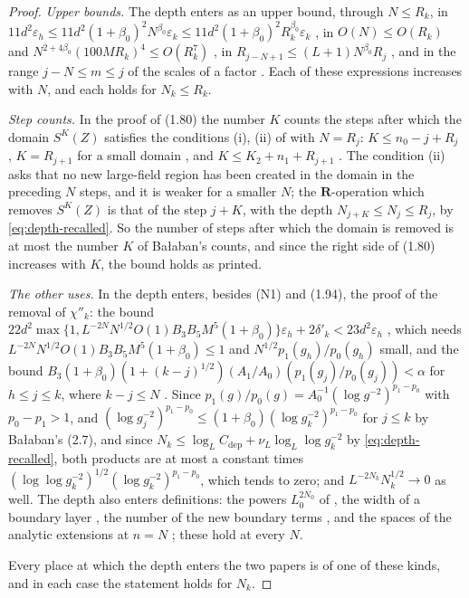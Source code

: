 \documentclass[11pt]{preprint}
\numberwithin{equation}{section}
\theoremstyle{definition}
\theoremstyle{remark}
\theoremstyle{plain}
\begin{document}
\begin{proof}
\emph{Upper bounds.} The depth enters as an upper bound, through $N \leq R_k$, in $11d^2\varepsilon_h \leq 11d^2(1 + \beta_0)^2N^{\beta_0}\varepsilon_k \leq 11d^2(1 + \beta_0)^2R_k^{\beta_0}\varepsilon_k$ \cite[p.~362]{BalabanLFR2}, in $O(N) \leq O(R_k)$ and $N^{2+4\beta_0}(100MR_k)^4 \leq O(R_k^7)$ \cite[p.~366]{BalabanLFR2}, in $R_{j-N+1} \leq (L + 1)N^{\beta_0}R_j$ \cite[pp.~382, 383]{BalabanLFR2}, and in the range $j - N \leq m \leq j$ of the scales of a factor \cite[p.~381]{BalabanLFR2}. Each of these expressions increases with $N$, and each holds for $N_k \leq R_k$.

\emph{Step counts.} In the proof of (1.80) the number $K$ counts the steps after which the domain $S^K(Z)$ satisfies the conditions (i), (ii) of \cite[p.~177]{BalabanLFR1} with $N = R_j$: $K \leq n_0 - j + R_j$ \cite[p.~385]{BalabanLFR2}, $K = R_{j+1}$ for a small domain \cite[p.~386]{BalabanLFR2}, and $K \leq K_2 + n_1 + R_{j+1}$ \cite[p.~387]{BalabanLFR2}. The condition (ii) asks that no new large-field region has been created in the domain in the preceding $N$ steps, and it is weaker for a smaller $N$; the $\mathbf R$-operation which removes $S^K(Z)$ is that of the step $j + K$, with the depth $N_{j+K} \leq N_j \leq R_j$, by \eqref{eq:depth-recalled}. So the number of steps after which the domain is removed is at most the number $K$ of Ba{\l}aban's counts, and since the right side of (1.80) increases with $K$, the bound holds as printed.

\emph{The other uses.} In \cite{BalabanLFR1} the depth enters, besides (N1) and (1.94), the proof of the removal of $\chi''_k$: the bound $22d^2\max\{1, L^{-2N}N^{1/2}O(1)B_3B_5M^5(1 + \beta_0)\}\varepsilon_h + 2\delta'_k < 23d^2\varepsilon_h$ \cite[p.~199]{BalabanLFR1}, which needs $L^{-2N}N^{1/2}O(1)B_3B_5M^5(1 + \beta_0) \leq 1$ and $N^{1/2}p_1(g_h)/p_0(g_h)$ small, and the bound $B_3(1 + \beta_0)(1 + (k - j)^{1/2})(A_1/A_0)(p_1(g_j)/p_0(g_j)) < \alpha$ for $h \leq j \leq k$, where $k - j \leq N$ \cite[p.~199]{BalabanLFR1}. Since $p_1(g)/p_0(g) = A_0^{-1}(\log g^{-2})^{p_1-p_0}$ with $p_0 - p_1 > 1$, and $(\log g_j^{-2})^{p_1-p_0} \leq (1 + \beta_0)(\log g_k^{-2})^{p_1-p_0}$ for $j \leq k$ by Ba{\l}aban's (2.7), and since $N_k \leq \log_LC_{\mathrm{dep}} + \nu_L\log_L\log g_k^{-2}$ by \eqref{eq:depth-recalled}, both products are at most a constant times $(\log\log g_k^{-2})^{1/2}(\log g_k^{-2})^{p_1-p_0}$, which tends to zero; and $L^{-2N_k}N_k^{1/2} \to 0$ as well. The depth also enters definitions: the powers $L_0^{2N_0}$ of \cite[p.~192]{BalabanLFR1}, the width of a boundary layer \cite[p.~363]{BalabanLFR2}, the number of the new boundary terms \cite[p.~369]{BalabanLFR2}, and the spaces of the analytic extensions at $n = N$ \cite[p.~375]{BalabanLFR2}; these hold at every $N$.

Every place at which the depth enters the two papers is of one of these kinds, and in each case the statement holds for $N_k$.
\end{proof}
\end{document}
